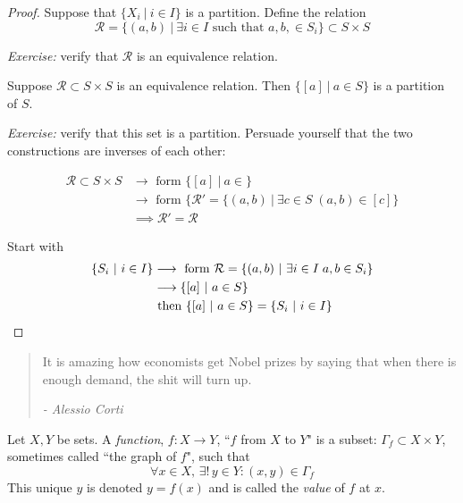 \documentclass[twoside]{scrartcl}
\newcommand{\rel}{\mathcal{R}}
\begin{document}
\begin{proof}
Suppose that $\{X_i ~|~ i \in I\}$ is a partition. Define the relation
\[\rel = \{(a,b) ~|~ \exists i \in I \text{ such that } a,b, \in S_i\} \subset S \times S\]

\emph{Exercise:} verify that $\rel$ is an equivalence relation.

Suppose $\rel \subset S \times S$ is an equivalence relation. Then 
$\{[a] ~|~ a \in S\}$
is a partition of $S$. 

\emph{Exercise:} verify that this set is a partition. Persuade yourself that the two constructions are inverses of each other:


\[\begin{aligned}\rel \subset S \times S &\longrightarrow \text{ form } \{[a] ~|~ a \in \}\\ &\longrightarrow \text{ form } \{\rel' = \{(a,b) ~|~ \exists c \in S\; (a,b) \in [c]\}\\
&\implies \rel' = \rel
\end{aligned}
\]

Start with 
\[\begin{aligned}\{S_i ~|~ i \in I\}&\longrightarrow \text{ form } \rel = \{(a,b) ~|~ \exists i \in I\; a,b \in S_i\}\\
&\longrightarrow \{[a] ~|~ a \in S\}\\
&\text{ then } \{[a] ~|~ a \in S\} = \{S_i ~|~ i \in I\}\qedhere
\end{aligned}\]  
\end{proof}




\begin{quote}
It is amazing how economists get Nobel prizes by saying that when there is enough demand, the shit will turn up.\begin{flushright}
      \textit{ -  Alessio Corti}
       \end{flushright} 
\end{quote} \vspace*{15pt}

\begin{definition} 
Let $X,Y$ be sets. A \emph{function}, $f: X \to Y$, ``$f$ from $X$ to $Y$" is a subset: $\Gamma_f \subset X \times Y$, sometimes called ``the graph of $f$", such that 
\[\forall x \in X,\,\exists!\, y \in Y: (x,y) \in \Gamma_f\]	
This unique $y$ is denoted $y = f(x)$ and is called the \emph{value} of $f$ at $x$. 
\end{definition}
\end{document}
